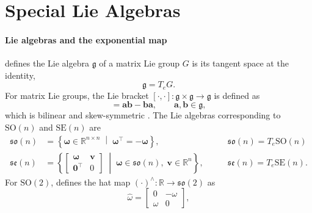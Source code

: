 \section{Special Lie Algebras}
\label{sec:special_lie_algebras}

\paragraph{Lie algebras and the exponential map}
\cite{Hall2000LieGroups} defines the Lie algebra \(\mathfrak{g}\) of a matrix Lie group \(G\) is its tangent space at the identity,
\begin{equation}
    \mathfrak{g}=T_{e}G.
    \label{eq:lie_algebra_tangent_space}
\end{equation}
For matrix Lie groups, the Lie bracket $[\cdot,\cdot]: \mathfrak{g} \times \mathfrak{g} \to \mathfrak{g}$ 
is defined as
\begin{equation}
    [\bm{a},\bm{b}]
    =
    \bm{a}\bm{b}-\bm{b}\bm{a},
    \qquad
    \bm{a},\bm{b}\in\mathfrak{g},
    \label{eq:matrix_lie_bracket}
\end{equation}
which is bilinear and skew-symmetric \cite{Hall2000LieGroups}. The Lie algebras corresponding to \(\mathrm{SO}(n)\) and \(\mathrm{SE}(n)\) are
\begin{align}
    \mathfrak{so}(n)
    &=
    \left\{
        \bm{\omega}\in\mathbb{R}^{n\times n}
        \;\middle|\;
        \bm{\omega}^{\top}=-\bm{\omega}
    \right\}
    \label{eq:so_algebra},
    \qquad
    &\mathfrak{so}(n) = T_{e}\mathrm{SO}(n)
    \\
    \mathfrak{se}(n)
    &=
    \left\{
        \begin{bmatrix}
            \bm{\omega} & \bm{v}\\
            \bm{0}^{\top} & 0
        \end{bmatrix}
        \;\middle|\;
        \bm{\omega}\in\mathfrak{so}(n),\;
        \bm{v}\in\mathbb{R}^{n}
    \right\},
    \qquad
    &\mathfrak{se}(n) = T_{e}\mathrm{SE}(n).
    \label{eq:se_algebra}
\end{align}
For \(\mathrm{SO}(2)\), \cite{Lee2008} defines the hat map $(\cdot)^\wedge: \mathbb{R} \rightarrow \mathfrak{so}(2)$ as
\begin{equation}
    \widehat{\omega}
    =
    \begin{bmatrix}
        0 & -\omega\\
        \omega & 0
    \end{bmatrix},
    \label{eq:hat_map_so2}
\end{equation}

